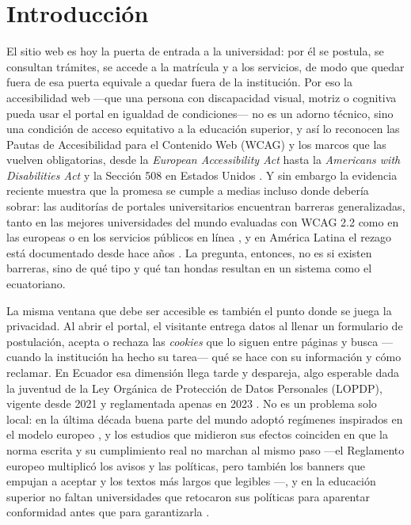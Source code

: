 \documentclass[11pt,a4paper]{article}
\begin{document}
\section{Introducci\'on}
El sitio web es hoy la puerta de entrada a la universidad: por él se postula, se consultan trámites, se accede a la matrícula y a los servicios, de modo que quedar fuera de esa puerta equivale a quedar fuera de la institución. Por eso la accesibilidad web ---que una persona con discapacidad visual, motriz o cognitiva pueda usar el portal en igualdad de condiciones--- no es un adorno técnico, sino una condición de acceso equitativo a la educación superior, y así lo reconocen las Pautas de Accesibilidad para el Contenido Web (WCAG) \citep{wcag21} y los marcos que las vuelven obligatorias, desde la \emph{European Accessibility Act} \citep{eaa2019} hasta la \emph{Americans with Disabilities Act} y la Sección 508 en Estados Unidos \citep{ada1990,section508}. Y sin embargo la evidencia reciente muestra que la promesa se cumple a medias incluso donde debería sobrar: las auditorías de portales universitarios encuentran barreras generalizadas, tanto en las mejores universidades del mundo evaluadas con WCAG 2.2 \citep{krittika2025accessibility} como en las europeas \citep{krejtz2025higher} o en los servicios públicos en línea \citep{aljedaani2025egovernment}, y en América Latina el rezago está documentado desde hace años \citep{campoverdemolina2023accessibility,acostavargas2020dataset}. La pregunta, entonces, no es si existen barreras, sino de qué tipo y qué tan hondas resultan en un sistema como el ecuatoriano.

La misma ventana que debe ser accesible es también el punto donde se juega la privacidad. Al abrir el portal, el visitante entrega datos al llenar un formulario de postulación, acepta o rechaza las \emph{cookies} que lo siguen entre páginas y busca ---cuando la institución ha hecho su tarea--- qué se hace con su información y cómo reclamar. En Ecuador esa dimensión llega tarde y despareja, algo esperable dada la juventud de la Ley Orgánica de Protección de Datos Personales (LOPDP), vigente desde 2021 y reglamentada apenas en 2023 \citep{lopdp2021,reglamentolopdp2023}. No es un problema solo local: en la última década buena parte del mundo adoptó regímenes inspirados en el modelo europeo \citep{gdpr2016}, y los estudios que midieron sus efectos coinciden en que la norma escrita y su cumplimiento real no marchan al mismo paso ---el Reglamento europeo multiplicó los avisos y las políticas, pero también los banners que empujan a aceptar y los textos más largos que legibles \citep{degeling2019value,kretschmer2021cookie}---, y en la educación superior no faltan universidades que retocaron sus políticas para aparentar conformidad antes que para garantizarla \citep{munot2025compliance}.
\end{document}
